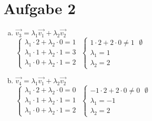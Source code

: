 \section{Aufgabe 2}

\begin{enumerate}[(a)]
    \item $\vec{v_3} = \lambda_1\vec{v_1} + \lambda_2\vec{v_2}$ \\[10pt]
        $\begin{cases}
            \lambda_1 \cdot 2 + \lambda_2 \cdot 0 = 1 \\
            \lambda_1 \cdot 1 + \lambda_2 \cdot 1 = 3\\
            \lambda_1 \cdot 0 + \lambda_2 \cdot 1 = 2
        \end{cases}$
        $\begin{cases}
            1 \cdot 2 + 2 \cdot 0 \neq 1 \ \ \ \emptyset \\
            \lambda_1 = 1 \\
            \lambda_2 = 2
        \end{cases}$
    \item $\vec{v_4} = \lambda_1\vec{v_1} + \lambda_2\vec{v_2}$ \\[10pt]
        $\begin{cases}
            \lambda_1 \cdot 2 + \lambda_2 \cdot 0 = 0 \\
            \lambda_1 \cdot 1 + \lambda_2 \cdot 1 = 1\\
            \lambda_1 \cdot 0 + \lambda_2 \cdot 1 = 2
        \end{cases}$
        $\begin{cases}
            -1 \cdot 2 + 2 \cdot 0 \neq 0 \ \ \ \emptyset \\
            \lambda_1 = -1 \\
            \lambda_2 = 2
        \end{cases}$
\end{enumerate}
